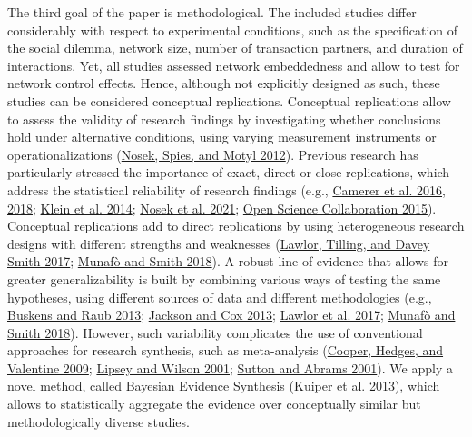 \documentclass[
  11pt,
]{article}
\begin{document}
The third goal of the paper is methodological.
The included studies differ considerably with respect to experimental conditions, such as the specification of the social dilemma, network size, number of transaction partners, and duration of interactions.
Yet, all studies assessed network embeddedness and allow to test for network control effects.
Hence, although not explicitly designed as such, these studies can be considered conceptual replications.
Conceptual replications allow to assess the validity of research findings by investigating whether conclusions hold under alternative conditions, using varying measurement instruments or operationalizations (\protect\hyperlink{ref-nosek_scientific_2012}{Nosek, Spies, and Motyl 2012}).
Previous research has particularly stressed the importance of exact, direct or close replications, which address the statistical reliability of research findings (e.g., \protect\hyperlink{ref-camerer2016evaluating}{Camerer et al. 2016}, \protect\hyperlink{ref-camerer2018evaluating}{2018}; \protect\hyperlink{ref-klein_etal_replicability_2014}{Klein et al. 2014}; \protect\hyperlink{ref-nosek_replicability_review_2021}{Nosek et al. 2021}; \protect\hyperlink{ref-open_science_collab_2015}{Open Science Collaboration 2015}).
Conceptual replications add to direct replications by using heterogeneous research designs with different strengths and weaknesses (\protect\hyperlink{ref-lawlor_triangulation_2017}{Lawlor, Tilling, and Davey Smith 2017}; \protect\hyperlink{ref-munafo_robust_2018}{Munafò and Smith 2018}).
A robust line of evidence that allows for greater generalizability is built by combining various ways of testing the same hypotheses, using different sources of data and different methodologies (e.g., \protect\hyperlink{ref-buskens_raub_handbook_2013}{Buskens and Raub 2013}; \protect\hyperlink{ref-jackson_cox_experimental_2013}{Jackson and Cox 2013}; \protect\hyperlink{ref-lawlor_triangulation_2017}{Lawlor et al. 2017}; \protect\hyperlink{ref-munafo_robust_2018}{Munafò and Smith 2018}).
However, such variability complicates the use of conventional approaches for research synthesis, such as meta-analysis (\protect\hyperlink{ref-cooper_handbook_2009}{Cooper, Hedges, and Valentine 2009}; \protect\hyperlink{ref-lipsey_wilson_2001}{Lipsey and Wilson 2001}; \protect\hyperlink{ref-sutton_bayesian_meta2001}{Sutton and Abrams 2001}).
We apply a novel method, called Bayesian Evidence Synthesis (\protect\hyperlink{ref-kuiper_combining_2013}{Kuiper et al. 2013}), which allows to statistically aggregate the evidence over conceptually similar but methodologically diverse studies.
\end{document}
